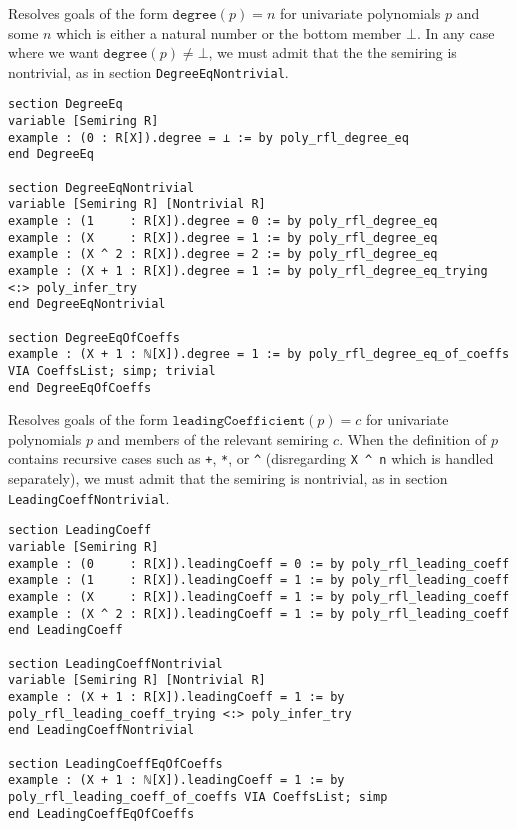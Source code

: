\begin{tactic}
\label{tac:poly_rfl_degree_eq}
\leanok
{}
Resolves goals of the form $\mathtt{degree}(p) = n$ for univariate polynomials $p$ and some $n$ which is either a natural number or the bottom member $\bot$. In any case where we want $\mathtt{degree}(p) \neq \bot$, we must admit that the the semiring is nontrivial, as in section \lstinline{DegreeEqNontrivial}.
\begin{lstlisting}
section DegreeEq
variable [Semiring R]
example : (0 : R[X]).degree = ⊥ := by poly_rfl_degree_eq
end DegreeEq

section DegreeEqNontrivial
variable [Semiring R] [Nontrivial R]
example : (1     : R[X]).degree = 0 := by poly_rfl_degree_eq
example : (X     : R[X]).degree = 1 := by poly_rfl_degree_eq
example : (X ^ 2 : R[X]).degree = 2 := by poly_rfl_degree_eq
example : (X + 1 : R[X]).degree = 1 := by poly_rfl_degree_eq_trying <:> poly_infer_try
end DegreeEqNontrivial

section DegreeEqOfCoeffs
example : (X + 1 : ℕ[X]).degree = 1 := by poly_rfl_degree_eq_of_coeffs VIA CoeffsList; simp; trivial
end DegreeEqOfCoeffs
\end{lstlisting}
\end{tactic}

\begin{tactic}
\label{tac:poly_rfl_leading_coeff}
\leanok
{}
Resolves goals of the form $\mathtt{leadingCoefficient}(p) = c$ for univariate polynomials $p$ and members of the relevant semiring $c$. When the definition of $p$ contains recursive cases such as \lstinline{+}, \lstinline{*}, or \lstinline{^} (disregarding \lstinline{X ^ n} which is handled separately), we must admit that the semiring is nontrivial, as in section \lstinline{LeadingCoeffNontrivial}.
\begin{lstlisting}
section LeadingCoeff
variable [Semiring R]
example : (0     : R[X]).leadingCoeff = 0 := by poly_rfl_leading_coeff
example : (1     : R[X]).leadingCoeff = 1 := by poly_rfl_leading_coeff
example : (X     : R[X]).leadingCoeff = 1 := by poly_rfl_leading_coeff
example : (X ^ 2 : R[X]).leadingCoeff = 1 := by poly_rfl_leading_coeff
end LeadingCoeff

section LeadingCoeffNontrivial
variable [Semiring R] [Nontrivial R]
example : (X + 1 : R[X]).leadingCoeff = 1 := by poly_rfl_leading_coeff_trying <:> poly_infer_try
end LeadingCoeffNontrivial

section LeadingCoeffEqOfCoeffs
example : (X + 1 : ℕ[X]).leadingCoeff = 1 := by poly_rfl_leading_coeff_of_coeffs VIA CoeffsList; simp
end LeadingCoeffEqOfCoeffs
\end{lstlisting}
\end{tactic}

